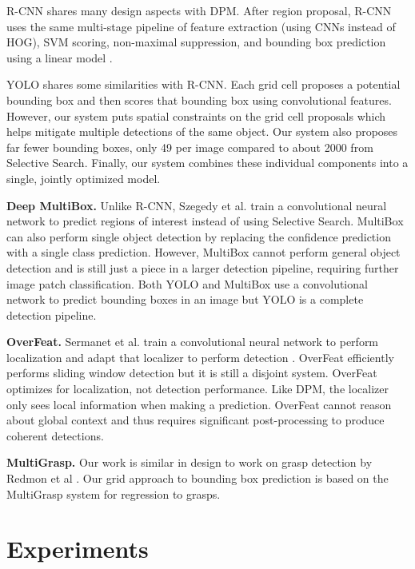 \documentclass{article} %
\begin{document}
R-CNN shares many design aspects with DPM. After region proposal, R-CNN uses the same multi-stage pipeline of feature extraction (using CNNs instead of HOG), SVM scoring, non-maximal suppression, and bounding box prediction using a linear model \cite{girshick2014rich}. 

YOLO shares some similarities with R-CNN. Each grid cell proposes a potential bounding box and then scores that bounding box using convolutional features. However, our system puts spatial constraints on the grid cell proposals which helps mitigate multiple detections of the same object. Our system also proposes far fewer bounding boxes, only 49 per image compared to about 2000 from Selective Search. Finally, our system combines these individual components into a single, jointly optimized model.

\textbf{Deep MultiBox.} Unlike R-CNN, Szegedy et al. train a convolutional neural network to predict regions of interest \cite{erhan2014scalable} instead of using Selective Search. MultiBox can also perform single object detection by replacing the confidence prediction with a single class prediction. However, MultiBox cannot perform general object detection and is still just a piece in a larger detection pipeline, requiring further image patch classification. Both YOLO and MultiBox use a convolutional network to predict bounding boxes in an image but YOLO is a complete detection pipeline.

\textbf{OverFeat.} Sermanet et al. train a convolutional neural network to perform localization and adapt that localizer to perform detection \cite{DBLP:journals/corr/SermanetEZMFL13}. OverFeat efficiently performs sliding window detection but it is still a disjoint system. OverFeat optimizes for localization, not detection performance. Like DPM, the localizer only sees local information when making a prediction. OverFeat cannot reason about global context and thus requires significant post-processing to produce coherent detections.

\textbf{MultiGrasp.} Our work is similar in design to work on grasp detection by Redmon et al \cite{DBLP:journals/corr/RedmonA14}. Our grid approach to bounding box prediction is based on the MultiGrasp system for regression to grasps.

\section{Experiments}
\end{document}
